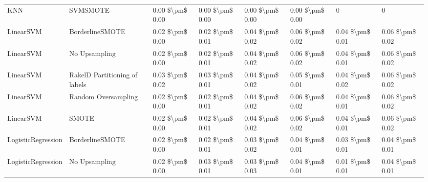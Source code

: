 \begin{tabular}{llllllll}
                            KNN &                      SVMSMOTE & 0.00 \$\textbackslash pm\$ 0.00 &           0.00 \$\textbackslash pm\$ 0.00 &       0.00 \$\textbackslash pm\$ 0.00 &        0.00 \$\textbackslash pm\$ 0.00 &                                       0 &                   0 \\
                      LinearSVM &               BorderlineSMOTE & 0.02 \$\textbackslash pm\$ 0.00 &           0.02 \$\textbackslash pm\$ 0.01 &       0.04 \$\textbackslash pm\$ 0.02 &        0.06 \$\textbackslash pm\$ 0.02 &                         0.04 \$\textbackslash pm\$ 0.01 &     0.06 \$\textbackslash pm\$ 0.02 \\
                      LinearSVM &                 No Upsampling & 0.02 \$\textbackslash pm\$ 0.00 &           0.02 \$\textbackslash pm\$ 0.01 &       0.04 \$\textbackslash pm\$ 0.02 &        0.06 \$\textbackslash pm\$ 0.02 &                         0.04 \$\textbackslash pm\$ 0.01 &     0.06 \$\textbackslash pm\$ 0.02 \\
                      LinearSVM & RakelD Partitioning of labels & 0.03 \$\textbackslash pm\$ 0.02 &           0.03 \$\textbackslash pm\$ 0.01 &       0.04 \$\textbackslash pm\$ 0.02 &        0.05 \$\textbackslash pm\$ 0.01 &                         0.04 \$\textbackslash pm\$ 0.02 &     0.06 \$\textbackslash pm\$ 0.02 \\
                      LinearSVM &           Random Oversampling & 0.02 \$\textbackslash pm\$ 0.00 &           0.02 \$\textbackslash pm\$ 0.01 &       0.04 \$\textbackslash pm\$ 0.02 &        0.06 \$\textbackslash pm\$ 0.02 &                         0.04 \$\textbackslash pm\$ 0.01 &     0.06 \$\textbackslash pm\$ 0.02 \\
                      LinearSVM &                         SMOTE & 0.02 \$\textbackslash pm\$ 0.00 &           0.02 \$\textbackslash pm\$ 0.01 &       0.04 \$\textbackslash pm\$ 0.02 &        0.06 \$\textbackslash pm\$ 0.02 &                         0.04 \$\textbackslash pm\$ 0.01 &     0.06 \$\textbackslash pm\$ 0.02 \\
             LogisticRegression &               BorderlineSMOTE & 0.02 \$\textbackslash pm\$ 0.00 &           0.02 \$\textbackslash pm\$ 0.01 &       0.03 \$\textbackslash pm\$ 0.02 &        0.04 \$\textbackslash pm\$ 0.01 &                         0.03 \$\textbackslash pm\$ 0.01 &     0.04 \$\textbackslash pm\$ 0.01 \\
             LogisticRegression &                 No Upsampling & 0.02 \$\textbackslash pm\$ 0.00 &           0.03 \$\textbackslash pm\$ 0.01 &       0.03 \$\textbackslash pm\$ 0.03 &        0.04 \$\textbackslash pm\$ 0.01 &                         0.01 \$\textbackslash pm\$ 0.01 &     0.04 \$\textbackslash pm\$ 0.01 \\

\end{tabular}
